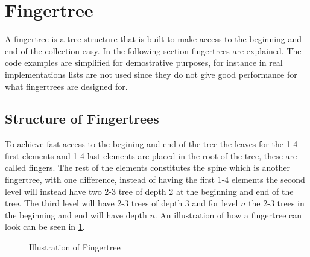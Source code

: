 \newpage

\section{Fingertree}
A fingertree is a tree structure that is built to make access to the beginning
and end of the collection easy. In the following section fingertrees are
explained. The code examples are simplified for demostrative purposes, for
instance in real implementations lists are not used since they do not give good
performance for what fingertrees are designed for.

\subsection{Structure of Fingertrees}
To achieve fast access to the begining and end of the tree the leaves for the
1-4 first elements and 1-4 last elements are placed in the root of the tree,
these are called fingers. The rest of
the elements constitutes the spine which is another fingertree, with one
difference, instead of having the first 1-4 elements the second level will
instead have two 2-3 tree of depth 2 at the beginning and end of the tree. The
third level will have 2-3 trees of depth 3 and for level $n$ the 2-3 trees in
the beginning and end will have depth $n$. An illustration of how a fingertree
can look can be seen in \cref{fig:fingertree}.

\begin{figure}[!h]
\centering
{} 
\caption{Illustration of Fingertree \label{fig:fingertree}}
\end{figure}

